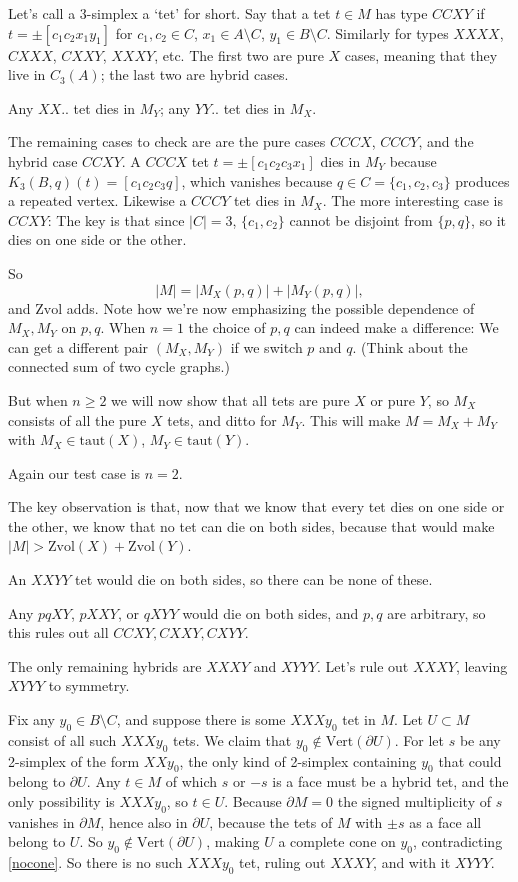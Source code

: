 \documentclass[12pt]{article}
\def\del{\partial}
\newcommand{\kw}{\mathrm}
\newcommand{\vertices}{\kw{Vert}}
\newcommand{\taut}{\kw{taut}}
\newcommand{\Zvol}{\kw{Zvol}}
\begin{document}
Let's call a $3$-simplex a `tet' for short.
Say that a tet $t \in M$ has type $CCXY$ if $t= \pm[c_1c_2x_1y_1]$
for $c_1,c_2 \in C$, $x_1 \in A \setminus C$, $y_1 \in B \setminus C$.
Similarly for types $XXXX$, $CXXX$, $CXXY$, $XXXY$, etc.
The first two are pure $X$ cases, meaning that they live in $C_3(A)$;
the last two are hybrid cases.

Any $XX..$ tet dies in $M_Y$;
any $YY..$ tet dies in $M_X$.

The remaining cases to check are
are the pure cases $CCCX$, $CCCY$,
and the hybrid case $CCXY$.
A $CCCX$ tet $t=\pm[c_1c_2c_3x_1]$ dies in $M_Y$ because
$K_3(B,q)(t)=[c_1c_2c_3q]$,
which vanishes because $q \in C = \{c_1,c_2,c_3\}$ produces a repeated vertex.
Likewise a $CCCY$ tet dies in $M_X$.
The more interesting case is $CCXY$:
The key is that since $|C|=3$, $\{c_1,c_2\}$ cannot be disjoint from $\{p,q\}$,
so it dies on one side or the other.

So 
\[
|M| = |M_X(p,q)| + |M_Y(p,q)|,
\]
and $\Zvol$ adds.
Note how we're now emphasizing the possible dependence of $M_X,M_Y$ on $p,q$.
When $n=1$ the choice of $p,q$ can indeed make a difference:
We can get a different pair $(M_X,M_Y)$ if we switch
$p$ and $q$.
(Think about the connected sum of two cycle graphs.)

But when $n \geq 2$ we will now show that all tets are pure $X$ or pure $Y$,
so $M_X$ consists of all the pure $X$ tets, and ditto for $M_Y$.
This will make
$M = M_X + M_Y$ with $M_X \in \taut(X)$, $M_Y \in \taut(Y)$.

Again our test case is $n=2$.

The key observation is that, now that we know that every tet dies on
one side or the other, we know that no tet can die on both sides,
because that would make $|M| > \Zvol(X) + \Zvol(Y)$.

An $XXYY$ tet would die on both sides, so there can be none of these.

Any $pqXY$, $pXXY$, or $qXYY$ would die on both sides, and $p,q$ are arbitrary,
so this rules out all $CCXY,CXXY,CXYY$.

The only remaining hybrids are $XXXY$ and $XYYY$.
Let's rule out $XXXY$, leaving $XYYY$ to symmetry.

Fix any $y_0 \in B \setminus C$, and suppose there is
some $XXXy_0$ tet in $M$.
Let $U \subset M$ consist of all such $XXXy_0$ tets.
We claim that $y_0 \notin \vertices(\del U)$.
For let $s$ be any 2-simplex of the form $XXy_0$,
the only kind of 2-simplex containing $y_0$ that could belong
to $\del U$.
Any $t \in M$ of which $s$ or $-s$ is a face must be a hybrid tet,
and the only possibility is $XXXy_0$, so $t \in U$.
Because $\del M = 0$ the signed multiplicity of $s$
vanishes in $\del M$,
hence also in $\del U$,
because the tets of $M$ with $\pm s$ as a face all belong to $U$.
So $y_0 \notin \vertices(\del U)$,
making $U$ a complete cone on $y_0$,
contradicting \ref{nocone}.
So there is no such $XXXy_0$ tet, ruling out $XXXY$,
and with it $XYYY$.
\end{document}
